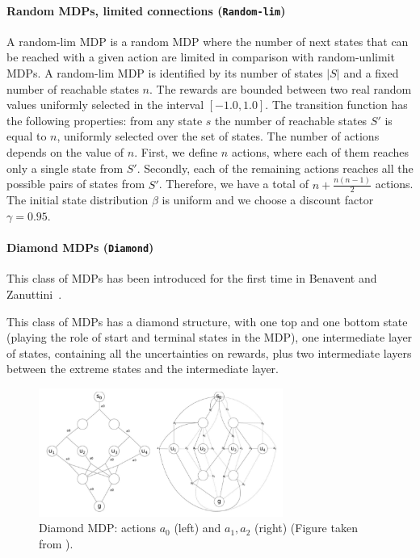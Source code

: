\paragraph{Random MDPs, limited connections (\texttt{Random-lim})}
A random-lim MDP is a random MDP where the number of next states that can be reached with a given action are limited in comparison with random-unlimit MDPs. A random-lim MDP is identified by its number of states $|S|$ and a fixed number of reachable states $n$. The rewards are bounded between two real random values uniformly selected in the interval $[-1.0,1.0]$.
The transition function has the following properties: from any state $s$ the number of reachable states $S'$ is equal to $n$, uniformly selected over the set of states. The number of actions depends on the value of $n$. First, we define $n$ actions, where each of them reaches only a single state from $S'$. Secondly, each of the remaining actions reaches all the possible pairs of states from $S'$. Therefore, we have a total of $n+\frac{n(n-1)}{2}$ actions. The initial state distribution $\beta$ is uniform and we choose a discount factor $\gamma = 0.95$.
\paragraph{Diamond MDPs (\texttt{Diamond})}
This class of MDPs has been introduced for the first time in Benavent and Zanuttini~\cite{benavent2018}. 

This class of MDPs has a diamond structure, with one top and one bottom state (playing the role of start and terminal states in the MDP), one intermediate layer of states, containing all the uncertainties on rewards, plus two intermediate layers between the extreme states and the intermediate layer. 

\begin{figure}[h]
\begin{center}
\includegraphics[width=8cm]{images/diamond.png}
\end{center}
\caption{Diamond MDP: actions $a_0$ (left) and $a_1, a_2$ (right) (Figure taken from \cite{benavent2018}).}
\label{fig:diamond}
\end{figure}



